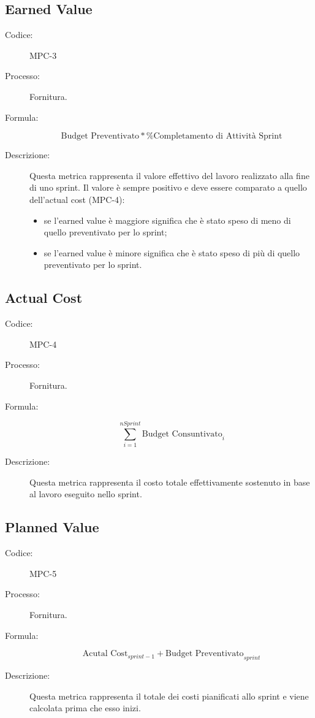 \subsection{Earned Value}
\begin{description}
    \item[Codice:] MPC-3
    \item[Processo:] Fornitura.
    \item[Formula:]
    \begin{equation}
        \text{Budget Preventivato} * \% \text{Completamento di Attività Sprint} 
    \end{equation}
    \item[Descrizione:] Questa metrica rappresenta il valore effettivo del lavoro realizzato alla fine di uno sprint. Il valore è sempre positivo e deve essere comparato a quello dell'actual cost (MPC-4):
    \begin{itemize}
        \item se l'earned value è maggiore significa che è stato speso di meno di quello preventivato per lo sprint;
        \item se l'earned value è minore significa che è stato speso di più di quello preventivato per lo sprint.
    \end{itemize}
\end{description}

\subsection{Actual Cost}
\begin{description}
    \item[Codice:] MPC-4
    \item[Processo:] Fornitura.
    \item[Formula:]
    \begin{equation}
        \sum_{i=1}^{nSprint} \text{Budget Consuntivato}_{i}
    \end{equation}
    \item[Descrizione:] Questa metrica rappresenta il costo totale effettivamente sostenuto in base al lavoro eseguito nello sprint.
\end{description}

\subsection{Planned Value}
\begin{description}
    \item[Codice:] MPC-5
    \item[Processo:] Fornitura.
    \item[Formula:]
    \begin{equation}
        \text{Acutal Cost}_{sprint - 1} + \text{Budget Preventivato}_{sprint} 
    \end{equation}
    \item[Descrizione:] Questa metrica rappresenta il totale dei costi pianificati allo sprint e viene calcolata prima che esso inizi.
\end{description}

